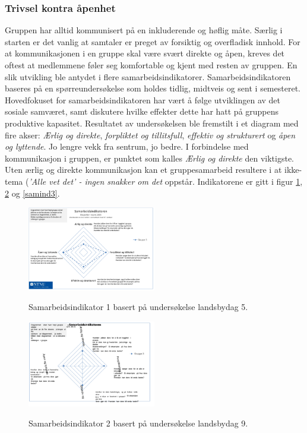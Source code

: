 \subsubsection{Trivsel kontra åpenhet}

Gruppen har alltid kommunisert på en inkluderende og høflig måte. 
Særlig i starten er det vanlig at samtaler er preget av forsiktig og overfladisk innhold. 
For at kommunikasjonen i en gruppe skal være svært direkte og åpen, kreves det oftest at medlemmene føler seg komfortable og kjent med resten av gruppen. 
En slik utvikling ble antydet i flere samarbeidsindikatorer. 
Samarbeidsindikatoren baseres på en spørreundersøkelse som holdes tidlig, midtveis og sent i semesteret.\\

Hovedfokuset for samarbeidsindikatoren har vært å følge utviklingen av det sosiale samværet, samt diskutere hvilke effekter dette har hatt på gruppens produktive kapasitet.
Resultatet av undersøkelsen ble fremstilt i et diagram med fire akser: \textit{Ærlig og direkte}, \textit{forpliktet og tillitsfull}, \textit{effektiv og strukturert} og \textit{åpen og lyttende}.
Jo lengre vekk fra sentrum, jo bedre.
I forbindelse med kommunikasjon i gruppen, er punktet som kalles \textit{Ærlig og direkte} den viktigste. 
Uten ærlig og direkte kommunikasjon kan et gruppesamarbeid resultere i at ikke-tema (\textit{'Alle vet det' - ingen snakker om det} oppstår.
Indikatorene er gitt i figur \ref{samind1}, \ref{samind2} og \ref{samind3}.

\begin{figure}[h!]
  \caption{Samarbeidsindikator 1 basert på undersøkelse landsbydag 5.}
  \centering
    \includegraphics[width=0.5\textwidth]{Bilder/samarbeidsindikator1.png}
    \label{samind1}
\end{figure}

\begin{figure}[h!]
  \caption{Samarbeidsindikator 2 basert på undersøkelse landsbydag 9.}
  \centering
    \includegraphics[width=0.5\textwidth]{Bilder/samarbeidsindikator_2.png}
    \label{samind2}
\end{figure}

